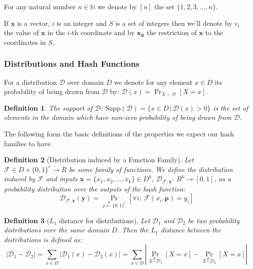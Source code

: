 \documentclass[12pt]{article}
\newtheorem{definition}{Definition}[section]
\newcommand{\Supp}[1]{\mathrm{Supp}\left(#1\right)}
\newcommand{\zo}[1]{\{0,1\}^{#1}}
\newcommand{\dist}{\mathcal{D}}
\newcommand{\F}{\mathcal{F}}
\newcommand{\abs}[1]{\left| #1 \right|}
\renewcommand{\vec}[1]{\bm{#1}}
\begin{document}
	For any natural number $n \in \mathbb{N}$ we denote by $\left[n\right]$ the set $\{1,2,3,\dots,n\}$.
	
	If $\vec{x}$ is a vector, $i$ is an integer and $S$ is a set of integers then we'll denote by $v_i$ the value of $\vec{x}$ in the $i$-th coordinate and by $\vec{x_S}$ the restriction of $\vec{x}$ to the coordinates in $S$. 
	
	\subsubsection{Distributions and Hash Functions}
	
	For a distribution $\dist$ over domain $D$ we denote for any element $x \in D$ its probability of being drawn from $\dist$ by: $\dist(x) = \Pr_{X \sim \dist} \left[ X = x \right]$.
	
	\begin{definition}
		The \emph{support} of $\dist$: $\Supp{\dist} = \{x \in D \, \vert \, \dist(x) > 0\}$ is the set of elements in the domain which have non-zero probability of being drawn from $\dist$.
	\end{definition}
	
	The following form the basic definitions of the properties we expect our hash families to have.
	
	\begin{definition}[Distribution induced by a Function Family]
		Let $\mathcal{F} \in D \times \zo{r} \rightarrow R$ be some family of functions.
		We define the \emph{distribution induced by $\mathcal{F}$ and inputs
			$\vec{x} = \{x_1,x_2,\dots,x_k\} \in D^k$},
		$\dist_{\mathcal{F},\vec{x}} : \: R^k \rightarrow \left[0,1\right]$,
		as a probability distribution over the outputs of the hash function:
		\begin{equation*}
			\dist_{\F,\vec{x}} (\vec{y}) = \Pr_{\rho \overset{R}{\leftarrow} \zo{r}} \left[\forall i : \: \F(x_i, \vec{\rho}) = y_i \right]
		\end{equation*}
	\end{definition}
	
	\begin{definition}[$L_1$ distance for distributions]
		Let $\dist_1$ and $\dist_2$ be two probability distributions over the same domain $D$.
		Then the $L_1$ distance between the distributions is defined as:
		\begin{equation*}
		\abs{\dist_1 - \dist_2}
		= \sum_{x \in D} \abs{\dist_1(x) - \dist_2(x)}
		= \sum_{x \in D} \abs{ \Pr_{X \overset{R}{\sim} \dist_1} \left[ X=x \right] - \Pr_{X \overset{R}{\sim} \dist_2} \left[ X=x \right]}
		\end{equation*}
	\end{definition}
	
\end{document}
